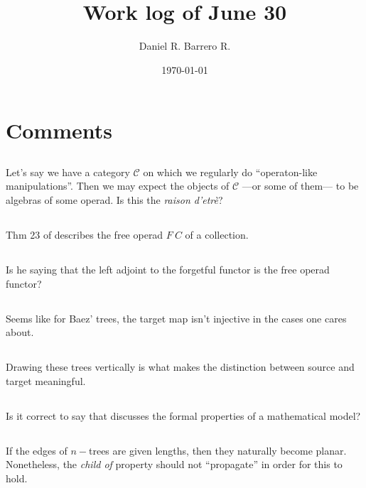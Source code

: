 \documentclass{amsart}
\title{Work log of June 30}
\author{Daniel R. Barrero R.}
\date{\today}
\begin{document}
\maketitle

\section{Comments}

\subsection{} Let's say we have a category $\mathcal{C}$ on which we
regularly do ``operaton-like manipulations''. Then we may expect the
objects of $\mathcal{C}$ ---or some of them--- to be algebras of some
operad. Is this the \emph{raison d'etrè}?

\subsection{} Thm 23 of \cite{baezOtter} describes the free operad $F \ C$
of a collection.

\subsection{} Is he saying that the left adjoint to the forgetful functor
is the free operad functor?

\subsection{} Seems like for Baez' trees, the target map isn't injective
in the cases one cares about.

\subsection{} Drawing these trees vertically is what makes the distinction
between source and target meaningful.


\subsection{} Is it correct to say that \cite{baezOtter} discusses
the formal properties of a mathematical model?

\subsection{} If the edges of $n-$trees are given lengths, then they
naturally become planar. Nonetheless, the \emph{child of} property should
not ``propagate'' in order for this to hold.
\end{document}
